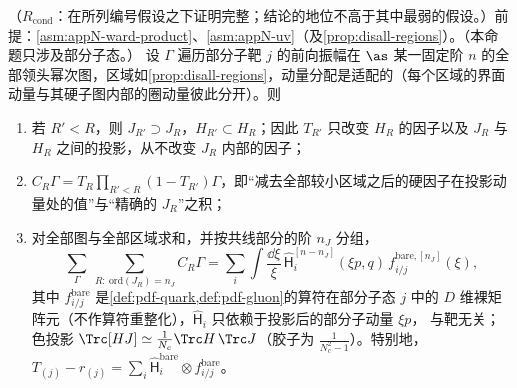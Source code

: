 \begin{proposition}\label{prop:disall-factorized-subtraction}
（$R_{\mathrm{cond}}$：在所列编号假设之下证明完整；结论的地位不高于其中最弱的假设。）前提：\cref{asm:appN-ward-product}、\cref{asm:appN-uv}（及\cref{prop:disall-regions}）。（本命题只涉及部分子态。）
设 $\Gamma$ 遍历部分子靶 $j$ 的前向振幅在 $\as$ 某一固定阶 $n$ 的全部领头幂次图，区域如\cref{prop:disall-regions}，动量分配是适配的（每个区域的界面动量与其硬子图内部的圈动量彼此分开）。则
\begin{enumerate}[label=(\roman*),leftmargin=2em,itemsep=1pt,topsep=2pt]
\item 若 $R'<R$，则 $J_{R'}\supset J_R$，$H_{R'}\subset H_R$；因此 $T_{R'}$ 只改变 $H_R$ 的因子以及 $J_R$ 与 $H_R$ 之间的投影，从不改变 $J_R$ 内部的因子；
\item $C_R\Gamma=T_R\prod_{R'<R}(1-T_{R'})\Gamma$，即“减去全部较小区域之后的硬因子在投影动量处的值”与“精确的 $J_R$”之积；
\item 对全部图与全部区域求和，并按共线部分的阶 $n_J$ 分组，
\begin{equation}\label{eq:disall-factorized}
\sum_\Gamma\ \sum_{R:\ \mathrm{ord}(J_R)=n_J}C_R\Gamma=\sum_i\int\frac{\dd\xi}{\xi}\,\hat{\mathsf H}^{[n-n_J]}_i(\xi p,q)\,f^{\mathrm{bare},[n_J]}_{i/j}(\xi),
\end{equation}
其中 $f^{\mathrm{bare}}_{i/j}$ 是\cref{def:pdf-quark,def:pdf-gluon}的算符在部分子态 $j$ 中的 $D$ 维裸矩阵元（不作算符重整化），$\hat{\mathsf H}_i$ 只依赖于投影后的部分子动量 $\xi p$，
与靶无关；色投影 $\Trc[HJ]\simeq\frac1{N_c}\Trc H\,\Trc J$（胶子为 $\frac1{N_c^2-1}$）。特别地，$T_{(j)}-r_{(j)}=\sum_i\hat{\mathsf H}^{\mathrm{bare}}_i\otimes f^{\mathrm{bare}}_{i/j}$。
\end{enumerate}
\end{proposition}

